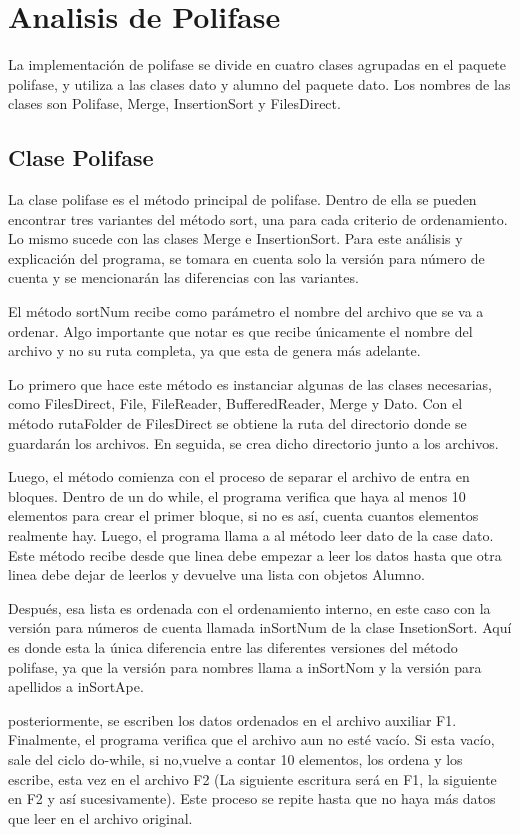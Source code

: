 \documentclass[11pt]{article}
\begin{document}
\section{Analisis de Polifase}
La implementación de polifase se divide en cuatro clases agrupadas en el paquete polifase, y utiliza a las  clases dato y alumno del paquete dato.
Los nombres de las clases son Polifase, Merge, InsertionSort y FilesDirect.

\subsection{Clase Polifase}
La clase polifase es el método principal de polifase. Dentro de ella se pueden encontrar tres variantes del método sort, una para cada criterio de ordenamiento. Lo mismo sucede con las clases Merge e InsertionSort. Para este análisis y explicación del programa, se tomara en cuenta solo la versión para número de cuenta y se mencionarán las diferencias con las variantes.

El método sortNum recibe como parámetro el nombre del archivo que se va a ordenar. Algo importante que notar es que recibe únicamente el nombre del archivo y no su ruta completa, ya que esta de genera más adelante. 

Lo primero que hace este método es instanciar algunas de las clases necesarias, como FilesDirect, File, FileReader, BufferedReader, Merge y Dato. Con el método rutaFolder de FilesDirect se obtiene la ruta del directorio donde se guardarán los archivos. En seguida, se crea dicho directorio junto a los archivos.

Luego, el método comienza con el proceso de separar el archivo de entra en bloques. Dentro de un do while, el programa verifica que haya al menos 10 elementos para crear el primer bloque, si no es así, cuenta cuantos elementos realmente hay. Luego, el programa llama a al método leer dato de la case dato. Este método recibe desde que linea debe empezar a leer los datos hasta que otra linea debe dejar de leerlos y devuelve una lista con objetos Alumno.

Después, esa lista es ordenada con el ordenamiento interno, en este caso con la versión para números de cuenta llamada inSortNum de la clase InsetionSort. Aquí es donde esta la única diferencia entre las diferentes versiones del método polifase, ya que la versión para nombres llama a inSortNom y la versión para apellidos a inSortApe.
 
posteriormente, se escriben los datos ordenados en el archivo auxiliar F1. Finalmente, el programa verifica que el archivo aun no esté vacío. Si esta vacío, sale del ciclo do-while, si no,vuelve a contar 10 elementos, los ordena y los escribe, esta vez en el archivo F2 (La siguiente escritura será en F1, la siguiente en F2 y así sucesivamente). Este proceso se repite hasta que no haya más datos que leer en el archivo original.
\end{document}
